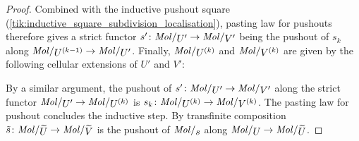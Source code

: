 \begin{proof}
    Combined with the inductive pushout square (\ref{tik:inductive_square_subdivision_localisation}), pasting law for pushouts therefore gives a strict functor \( s' \colon \molecin{U'} \to \molecin{V'} \) being the pushout of \( s_k \) along \( \molecin{\order{k - 1}{U}} \to \molecin{U'} \).
    Finally, \( \molecin{\order k U} \) and \(  {\molecin{\order k V}} \) are given by the following cellular extensions of \( U' \) and \( V' \):
    \begin{center}
    \end{center}
    By a similar argument, the pushout of \( s' \colon  \molecin{U'} \to \molecin{V'} \) along the strict functor \( \molecin{U'} \to \molecin{\order{k}{U}} \) is \( s_k \colon \molecin{\order{k}{U}} \to \molecin{\order{k}{V}} \).
    The pasting law for pushout concludes the inductive step.
    By transfinite composition \( \tilde{s} \colon \molecin{\selfloc{U}} \to \molecin{\selfloc{V}} \) is the pushout of \( \molecin{s} \) along \( \molecin{U} \to \molecin{\selfloc U} \).
\end{proof}

